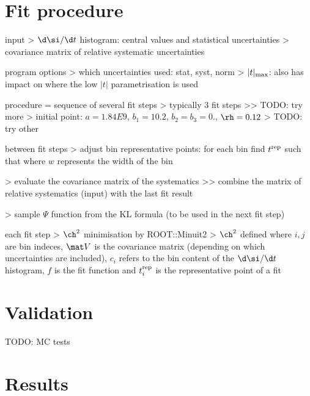 \chapter[fit]{Fit procedure}

\> input
\>> $\d\si/\d t$ histogram: central values and statistical uncertainties
\>> covariance matrix of relative systematic uncertainties

\> program options
\>> which uncertainties used: stat, syst, norm
\>> $|t|_{\rm max}$: also has impact on where the low $|t|$ parametrisation is used

\> procedure = sequence of several fit steps
\>> typically 3 fit steps
\>>> TODO: try more
\>> initial point: $a = 1.84E9$, $b_1 = 10.2$, $b_2 = b_3 = 0.$, $\rh = 0.12$
\>> TODO: try other

\> between fit steps
\>> adjust bin representative points: for each bin find $t^{\rm rep}$ such that
where $w$ represents the width of the bin

\>> evaluate the covariance matrix of the systematics
\>>> combine the matrix of relative systematics (input) with the last fit result

\>> sample $\Psi$ function from the KL formula (to be used in the next fit step)

\> each fit step
\>> $\ch^2$ minimisation by ROOT::Minuit2
\>> $\ch^2$ defined
where $i,j$ are bin indeces, $\mat V$ is the covariance matrix (depending on which uncertainties are included), $c_i$ refers to the bin content of the $\d\si/\d t$ histogram, $f$ is the fit function and $t^{\rm rep}_i$ is the representative point of a fit

%


\chapter{Validation}

\> TODO: MC tests


\chapter{Results}





\EndText
\bye
